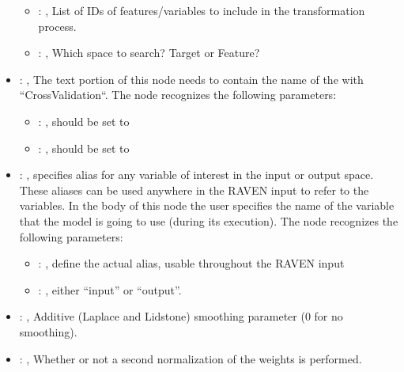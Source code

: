 \begin{itemize}
\begin{itemize}
        \item {}: , 
          List of IDs of features/variables to include in the transformation process.

        \item {}: , 
          Which space to search? Target or Feature?
      \end{itemize}

    \item {}: , 
      The text portion of this node needs to contain the name of the  with
               ``CrossValidation``.
      The  node recognizes the following parameters:
        \begin{itemize}
          \item {}: , 
            should be set to 
          \item {}: , 
            should be set to 
      \end{itemize}

    \item {}: , 
      specifies alias for         any variable of interest in the input or output space. These
      aliases can be used anywhere in the RAVEN input to         refer to the variables. In the body
      of this node the user specifies the name of the variable that the model is going to use
      (during its execution).
      The  node recognizes the following parameters:
        \begin{itemize}
          \item {}: , 
            define the actual alias, usable throughout the RAVEN input
          \item {}: , 
            either ``input'' or ``output''.
      \end{itemize}

    \item {}: , 
      Additive (Laplace and Lidstone) smoothing parameter (0 for no smoothing).

    \item {}: , 
      Whether or not a second normalization of the weights is performed.


\end{itemize}
